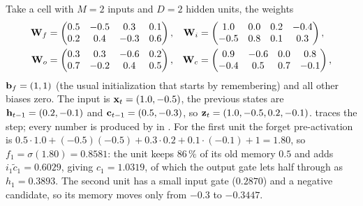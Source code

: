 \begin{example}
\label{ex:ch20-cell}
Take a cell with $M = 2$ inputs and $D = 2$ hidden units, the weights
\begin{align*}
  \mathbf{W}_f &= \begin{pmatrix} 0.5 & -0.5 & 0.3 & 0.1 \\ 0.2 & 0.4 & -0.3 & 0.6 \end{pmatrix}, &
  \mathbf{W}_i &= \begin{pmatrix} 1.0 & 0.0 & 0.2 & -0.4 \\ -0.5 & 0.8 & 0.1 & 0.3 \end{pmatrix},\\
  \mathbf{W}_o &= \begin{pmatrix} 0.3 & 0.3 & -0.6 & 0.2 \\ 0.7 & -0.2 & 0.4 & 0.5 \end{pmatrix}, &
  \mathbf{W}_c &= \begin{pmatrix} 0.9 & -0.6 & 0.0 & 0.8 \\ -0.4 & 0.5 & 0.7 & -0.1 \end{pmatrix},
\end{align*}
$\mathbf{b}_f = (1, 1)$ (the usual initialization that starts by remembering)
and all other biases zero. The input is $\mathbf{x}_t = (1.0, -0.5)$, the
previous states are $\mathbf{h}_{t-1} = (0.2, -0.1)$ and $\mathbf{c}_{t-1} = (0.5,
-0.3)$, so $\mathbf{z}_t = (1.0, -0.5, 0.2, -0.1)$.  traces
the step; every number is produced by  in
. For the first unit the forget pre-activation is
$0.5 \cdot 1.0 + (-0.5)(-0.5) + 0.3 \cdot 0.2 + 0.1 \cdot (-0.1) + 1 = 1.80$,
so $f_1 = \sigma(1.80) = 0.8581$: the unit keeps $86\,\%$ of its old memory
$0.5$ and adds $i_1 \tilde{c}_1 = 0.6029$, giving $c_1 = 1.0319$, of which
the output gate lets half through as $h_1 = 0.3893$. The second unit has a
small input gate ($0.2870$) and a negative candidate, so its memory moves
only from $-0.3$ to $-0.3447$.
\end{example}

